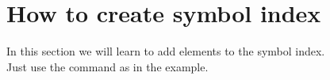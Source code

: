 \section{How to create symbol index}
In this section we will learn to add elements to the symbol index.\\
Just use the command as in the example.


